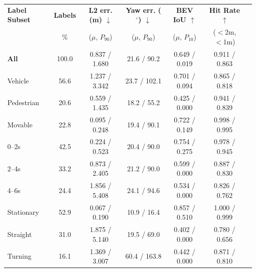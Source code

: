 \begin{tabular}{lcccccc}
\toprule
\textbf{Label Subset} & \textbf{Labels} & \textbf{L2 err. (m) $\downarrow$} & \textbf{Yaw err. ($^\circ$) $\downarrow$} & \textbf{BEV IoU $\uparrow$} & \textbf{Hit Rate $\uparrow$} \\
 & \% & ($\mu$, $P_{90}$) & ($\mu$, $P_{90}$) & ($\mu$, $P_{10}$) & ($<$2m, $<$1m) \\
\midrule \midrule
\textbf{All} & 100.0 & 0.837 / 1.680 & 21.6 / 90.2 & 0.649 / 0.019 & 0.911 / 0.863 \\
\midrule
Vehicle & 56.6 & 1.237 / 3.342 & 23.7 / 102.1 & 0.701 / 0.094 & 0.865 / 0.818 \\
Pedestrian & 20.6 & 0.559 / 1.435 & 18.2 / 55.2 & 0.425 / 0.000 & 0.941 / 0.839 \\
Movable & 22.8 & 0.095 / 0.248 & 19.4 / 90.1 & 0.722 / 0.149 & 0.998 / 0.995 \\
\midrule
0--2s & 42.5 & 0.224 / 0.523 & 20.4 / 90.0 & 0.754 / 0.275 & 0.978 / 0.945 \\
2--4s & 33.2 & 0.873 / 2.405 & 21.2 / 90.0 & 0.599 / 0.000 & 0.887 / 0.830 \\
4--6s & 24.4 & 1.856 / 5.408 & 24.1 / 94.6 & 0.534 / 0.000 & 0.826 / 0.762 \\
\midrule
Stationary & 52.9 & 0.067 / 0.190 & 10.9 / 16.4 & 0.857 / 0.510 & 1.000 / 0.999 \\
Straight & 31.0 & 1.875 / 5.140 & 19.5 / 69.0 & 0.402 / 0.000 & 0.780 / 0.656 \\
Turning & 16.1 & 1.369 / 3.007 & 60.4 / 163.8 & 0.442 / 0.000 & 0.871 / 0.810 \\
\bottomrule
\end{tabular}
